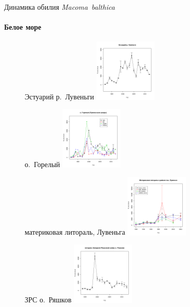 \documentclass{beamer}
\begin{document}
\begin{frame}{Динамика обилия {\it Macoma~balthica}}
\framesubtitle{Белое море}
\begin{figure}
	\begin{minipage}[b]{.3\linewidth}
	\begin{center}
\tiny{Эстуарий р.~Лувеньги}
\includegraphics[width=30mm]{../White_Sea/Estuatiy_Luvenga/N2_dynamic.pdf}
	\end{center}
	\end{minipage}
\hfil %
	\begin{minipage}[b]{.3\linewidth}
	\begin{center}
\tiny{о.~Горелый}
\includegraphics[width=30mm]{../White_Sea/Luvenga_Goreliy/N2_dynamic.pdf}
	\end{center}
	\end{minipage}
\hfil %
	\begin{minipage}[b]{.3\linewidth}
	\begin{center}
\tiny{материковая литораль, Лувеньга}
\includegraphics[width=30mm]{../White_Sea//Luvenga_II_razrez/N2_dynamic.pdf}
	\end{center}
	\end{minipage}
	\begin{minipage}[b]{.3\linewidth}
	\begin{center}
\tiny{ЗРС о.~Ряшков}
\includegraphics[width=30mm]{../White_Sea/Ryashkov_ZRS/N2_dynamic.pdf}

\end{center}
\end{minipage}
\end{figure}
\end{frame}
\end{document}
